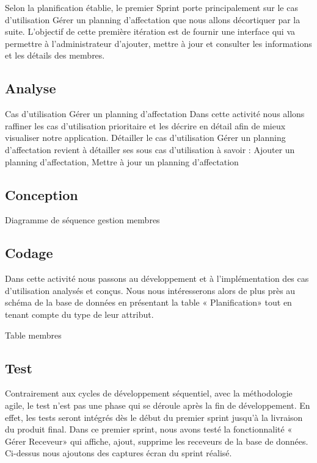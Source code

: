  Selon la planification \'{e}tablie, le premier Sprint porte principalement sur le cas
d'utilisation \guillemotleft{} G\'{e}rer un planning d'affectation\guillemotright{} que nous allons d\'{e}cortiquer par la suite.
L'objectif de cette premi\`{e}re it\'{e}ration est de fournir une interface qui va permettre \`{a}
l'administrateur d'ajouter, mettre \`{a} jour et consulter les informations et les d\'{e}tails des membres.

\subsection{Analyse}

 Cas d'utilisation \guillemotleft{} G\'{e}rer un planning d'affectation\guillemotright{}
Dans cette activit\'{e} nous allons raffiner les cas d'utilisation prioritaire et les d\'{e}crire en d\'{e}tail
afin de mieux visualiser notre application.
D\'{e}tailler le cas d'utilisation \guillemotleft{}G\'{e}rer un planning d'affectation\guillemotright{} revient \`{a} d\'{e}tailler 
ses sous cas d'utilisation \`{a} savoir :
\textbullet{} Ajouter un planning d'affectation,
\textbullet{} Mettre \`{a} jour un planning d'affectation


\subsection{Conception}

 Diagramme de séquence gestion membres

\subsection{Codage}

 Dans cette activité nous passons au développement et à l’implémentation des cas d’utilisation
analysés et conçus.
Nous nous intéresserons alors de plus près au schéma de la base de données en présentant la
table « Planification» tout en tenant compte du type de leur attribut.

Table membres

\subsection{Test}
Contrairement aux cycles de développement séquentiel, avec la méthodologie agile, le test n'est
pas une phase qui se déroule après la fin de développement. En effet, les tests seront intégrés
dès le début du premier sprint jusqu’à la livraison du produit final.
Dans ce premier sprint, nous avons testé la fonctionnalité « Gérer Receveur» qui affiche, ajout,
supprime les receveurs de la base de données.
Ci-dessus nous ajoutons des captures écran du sprint réalisé.